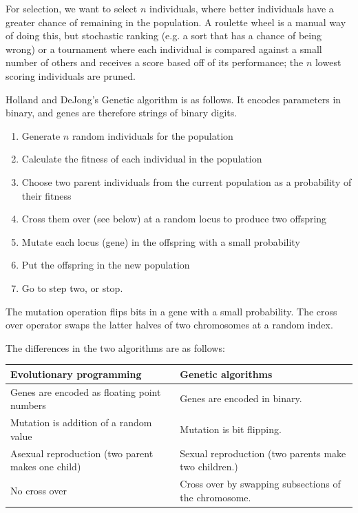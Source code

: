 For selection, we want to select $n$ individuals, where better individuals have
a greater chance of remaining in the population. A roulette wheel is a manual
way of doing this, but stochastic ranking (e.g. a sort that has a chance of
being wrong) or a tournament where each individual is compared against a small
number of others and receives a score based off of its performance; the $n$
lowest scoring individuals are pruned.

Holland and DeJong's Genetic algorithm is as follows. It encodes parameters in
binary, and genes are therefore strings of binary digits.

\begin{enumerate}
  \item Generate $n$ random individuals for the population
  \item Calculate the fitness of each individual in the population
  \item Choose two parent individuals from the current population as a 
  probability of their fitness
  \item Cross them over (see below) at a random locus to produce two offspring
  \item Mutate each locus (gene) in the offspring with a small probability
  \item Put the offspring in the new population
  \item Go to step two, or stop.
\end{enumerate}

The mutation operation flips bits in a gene with a small probability. The cross
over operator swaps the latter halves of two chromosomes at a random index.


The differences in the two algorithms are as follows:

\begin{center}
  \begin{tabularx}{0.8\textwidth}{X|X}
    \textbf{Evolutionary programming} & \textbf{Genetic algorithms}\\ \hline
    Genes are encoded as floating point numbers & Genes are encoded in binary.\\
    Mutation is addition of a random value & Mutation is bit flipping.\\
    Asexual reproduction (two parent makes one child) & Sexual reproduction (two
    parents make two children.)\\
    No cross over & Cross over by swapping subsections of the chromosome.
  \end{tabularx}
\end{center}

